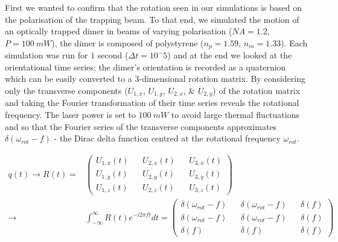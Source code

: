 First we wanted to confirm that the rotation seen in our simulations is
based on the polarisation of the trapping beam. To that end, we simulated 
the motion of an optically trapped dimer in beams of varying polarisation 
($NA=1.2$, $P=100\ mW$), the dimer is composed of polystyrene ($n_p=1.59$, 
$n_m=1.33$). Each simulation was run for $1$ second ($\Delta t =10^-5$) 
and at the end we looked at the orientational time series; the dimer's 
orientation is recorded as a quaternion which can be easily converted to 
a 3-dimensional rotation matrix. By considering only the transverse 
components ($U_{1,x}$, $U_{1,y}$, $U_{2,x}$, \& $U_{2,y}$) of the rotation 
matrix and taking the Fourier transformation of their time series reveals 
the rotational frequency. The laser power is set to $100\ mW$ to avoid 
large thermal fluctuations and so that the Fourier series of the transverse 
components approximates $\delta(\omega_{rot}-f)$ - the Dirac delta function 
centred at the rotational frequency $\omega_{rot}$.

\begin{equation}
	\begin{split}
		q(t) \rightarrow R(t) =& 
		\begin{pmatrix}
			U_{1,x}(t) && U_{2,x}(t) && U_{3,x}(t) \\
			U_{1,y}(t) && U_{2,y}(t) && U_{3,y}(t) \\
			U_{1,z}(t) && U_{2,z}(t) && U_{3,z}(t) 
		\end{pmatrix} \\
		\rightarrow
		&\int^\infty_{-\infty}R(t)e^{-i2\pi ft} dt = 
		\begin{pmatrix}
			\delta(\omega_{rot}-f) && \delta(\omega_{rot}-f) && \delta(f) \\
			\delta(\omega_{rot}-f) && \delta(\omega_{rot}-f) && \delta(f)\\
			\delta(f) && \delta(f) && \delta(f)
		\end{pmatrix}
	\end{split}
\end{equation}

